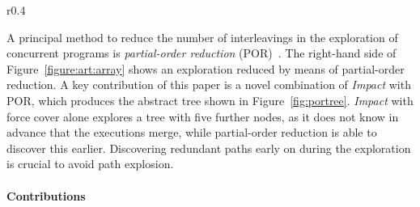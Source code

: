 \documentclass[conference]{IEEEtran}
\begin{document}
\begin{wrapfigure}[10]{r}{0.4\linewidth}
\caption{\emph{Impact} with POR and force cover
\label{fig:portree} }
\end{wrapfigure}
%
A principal method to reduce the number of interleavings in the exploration
of concurrent programs is \emph{partial-order reduction} (POR)~\mbox{\cite{DBLP:books/sp/Godefroid96,DBLP:conf/cav/Peled93,DBLP:conf/apn/Valmari89,DBLP:journals/fmsd/Godefroid05}}. 
The right-hand side of Figure~\ref{figure:art:array} shows an exploration reduced by means
of partial-order reduction.  A key contribution of this paper is a novel
combination of \emph{Impact} with POR, which produces
the abstract tree shown in Figure~\ref{fig:portree}. 
\emph{Impact} with force cover alone explores a tree with five further nodes, as it does not
know in advance that the executions merge, while partial-order reduction is
able to discover this earlier. Discovering redundant paths early on during the
exploration is crucial to avoid path explosion.


\paragraph*{Contributions}
\end{document}
